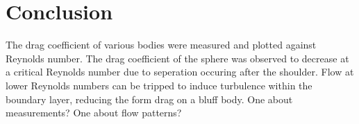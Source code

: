 \documentclass[8pt]{article}
\begin{document}
\section{Conclusion}

The drag coefficient of various bodies were measured and plotted against Reynolds number.
The drag coefficient of the sphere was observed to decrease at a critical Reynolds number due to seperation occuring after the shoulder.
Flow at lower Reynolds numbers can be tripped to induce turbulence within the boundary layer, reducing the form drag on a bluff body.
One about measurements?
One about flow patterns?
\end{document}
